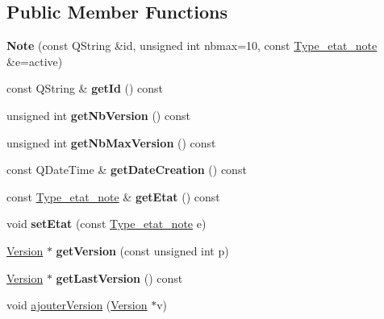 \subsection*{Public Member Functions}
\begin{DoxyCompactItemize}
\item 
\mbox{\label{class_note_a74953ca0f81bb48c57bfc398bd0dc86a}} 
{\bfseries Note} (const Q\+String \&id, unsigned int nbmax=10, const \hyperlink{note_8h_a952f39258bbc825f3d94ffd41440486b}{Type\+\_\+etat\+\_\+note} \&e=active)
\item 
\mbox{\label{class_note_aff851c4b14e763f5e00755a3a12fbe76}} 
const Q\+String \& {\bfseries get\+Id} () const
\item 
\mbox{\label{class_note_ab5007eef00e371eada1b31ce2afe15d3}} 
unsigned int {\bfseries get\+Nb\+Version} () const
\item 
\mbox{\label{class_note_ae967accab8c1783536e3dd49bfe87098}} 
unsigned int {\bfseries get\+Nb\+Max\+Version} () const
\item 
\mbox{\label{class_note_a2db69efc8a682af2b404a05df78edd63}} 
const Q\+Date\+Time \& {\bfseries get\+Date\+Creation} () const
\item 
\mbox{\label{class_note_a36ef7b5d9687d36aba0baf626a125d86}} 
const \hyperlink{note_8h_a952f39258bbc825f3d94ffd41440486b}{Type\+\_\+etat\+\_\+note} \& {\bfseries get\+Etat} () const
\item 
\mbox{\label{class_note_aa53e04aa5c6c39867eb10b5b5f274f93}} 
void {\bfseries set\+Etat} (const \hyperlink{note_8h_a952f39258bbc825f3d94ffd41440486b}{Type\+\_\+etat\+\_\+note} e)
\item 
\mbox{\label{class_note_a015599af2e64410923961d9ef6b3e18d}} 
\hyperlink{class_version}{Version} $\ast$ {\bfseries get\+Version} (const unsigned int p)
\item 
\mbox{\label{class_note_a300a142b7cb07872522b6d16b4c77524}} 
\hyperlink{class_version}{Version} $\ast$ {\bfseries get\+Last\+Version} () const
\item 
void \hyperlink{class_note_a6a150fba840245d5c99c058e3457e775}{ajouter\+Version} (\hyperlink{class_version}{Version} $\ast$v)

\end{DoxyCompactItemize}
